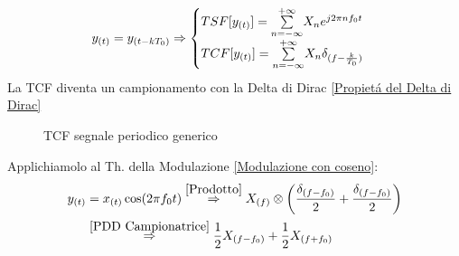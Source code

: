                     \[
                        y_{(t)} = y_{(t-kT_0)} \Rightarrow 
                        \begin{cases}
                            TSF[y_{(t)}] = \overunderset{+\infty}{n = -\infty}{\sum} X_n e^{j2\pi nf_0t}\nonumber \\
                            TCF[y_{(t)}] = \overunderset{+\infty}{n = -\infty}{\sum} X_n \delta_{(f-\frac{k}{T_0})} \nonumber 
                        \end{cases}
                    \]
                    La TCF diventa un campionamento con la Delta di Dirac \ref{Propietá del Delta di Dirac}

                    \begin{figure}[H]
                        \centering
                        \caption{TCF segnale periodico generico}
                        \label{fig:TCF segnale periodico generico}
                    \end{figure}

                    Applichiamolo al Th. della Modulazione \ref{Modulazione con coseno}:\\
                    \begin{align}
                        y_{(t)} &= x_{(t)}\cos(2\pi f_0t) \overset{\ref{Prodotto}}{\Rightarrow} X_{(f)}\otimes\left(\frac{\delta_{(f-f_0)}}{2} + \frac{\delta_{(f-f_0)}}{2}\right)\nonumber \\
                                &\overset{\ref{PDD Campionatrice}}{\Rightarrow} \frac{1}{2} X_{(f-f_0)} + \frac{1}{2} X_{(f+f_0)}\nonumber 
                    \end{align}

